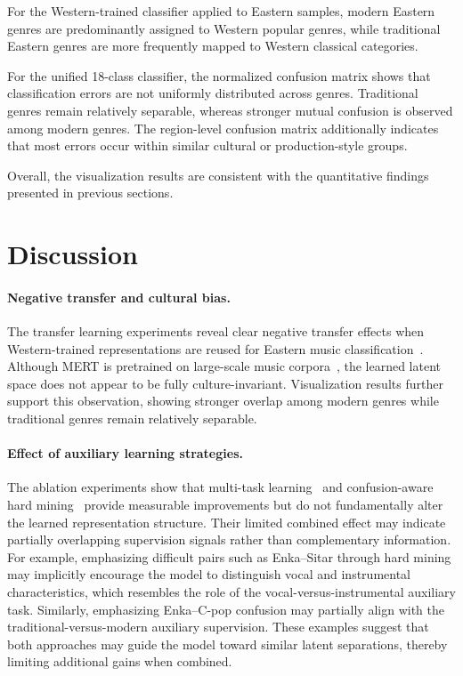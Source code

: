 \documentclass{article}
\begin{document}
For the Western-trained classifier applied to Eastern samples, modern Eastern genres are predominantly assigned to Western popular genres, while traditional Eastern genres are more frequently mapped to Western classical categories.

For the unified 18-class classifier, the normalized confusion matrix shows that classification errors are not uniformly distributed across genres. Traditional genres remain relatively separable, whereas stronger mutual confusion is observed among modern genres. The region-level confusion matrix additionally indicates that most errors occur within similar cultural or production-style groups.

Overall, the visualization results are consistent with the quantitative findings presented in previous sections.


\section{Discussion}

\paragraph{Negative transfer and cultural bias.}
The transfer learning experiments reveal clear negative transfer effects when Western-trained representations are reused for Eastern music classification~\citep{pan2009survey,choi2017transfer}. Although MERT is pretrained on large-scale music corpora~\citep{li2024mert}, the learned latent space does not appear to be fully culture-invariant. Visualization results further support this observation, showing stronger overlap among modern genres while traditional genres remain relatively separable.

\paragraph{Effect of auxiliary learning strategies.}
The ablation experiments show that multi-task learning~\citep{ruder2017overview} and confusion-aware hard mining~\citep{susmaga2004confusion} provide measurable improvements but do not fundamentally alter the learned representation structure. Their limited combined effect may indicate partially overlapping supervision signals rather than complementary information. For example, emphasizing difficult pairs such as Enka--Sitar through hard mining may implicitly encourage the model to distinguish vocal and instrumental characteristics, which resembles the role of the vocal-versus-instrumental auxiliary task. Similarly, emphasizing Enka--C-pop confusion may partially align with the traditional-versus-modern auxiliary supervision. These examples suggest that both approaches may guide the model toward similar latent separations, thereby limiting additional gains when combined.
\end{document}
